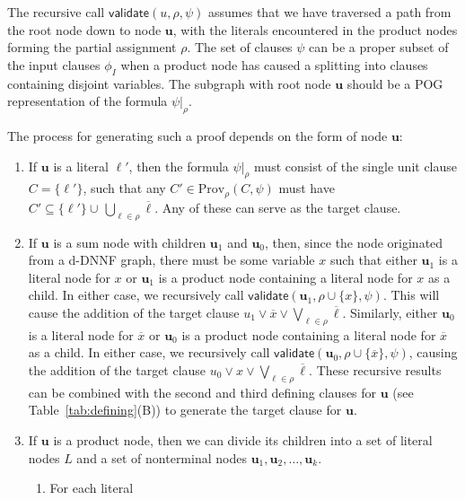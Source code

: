 \documentclass[letterpaper,USenglish,cleveref, autoref, thm-restate]{lipics-v2021}
\newcommand{\obar}[1]{\overline{#1}}
\newcommand{\lit}{\ell}
\newcommand{\assign}{\alpha}
\newcommand{\passign}{\rho}
\newcommand{\validate}{\textsf{validate}}
\newcommand{\prov}{\textrm{Prov}}
\newcommand{\inputformula}{\phi_I}
\newcommand{\makenode}[1]{\mathbf{#1}}
\newcommand{\nodeu}{\makenode{u}}
\newcommand{\simplify}[2]{#1|_{#2}}
\begin{document}
The recursive call $\validate(u, \passign, \psi)$ assumes that we have
traversed a path from the root node down to node $\nodeu$, with the
literals encountered in the product nodes forming the partial
assignment $\passign$.  The set of clauses $\psi$ can be a proper
subset of the input clauses $\inputformula$ when a product node has caused
a splitting into clauses containing disjoint variables.
The subgraph with root node $\nodeu$ should be a POG representation of the formula
$\simplify{\psi}{\passign}$.

The process for generating such a proof depends on the form of node $\nodeu$:
\begin{enumerate}
\item If $\nodeu$ is a literal $\lit'$, then the formula
  $\simplify{\psi}{\passign}$ must consist of the single unit clause
  $C = \{\lit'\}$, such that any $C' \in \prov_{\passign}(C, \psi)$ must have $C' \subseteq \{ \lit' \} \cup\, \bigcup_{\lit \in \passign} \obar{\lit}$.
  Any of these can
  serve as the target clause.
\item If $\nodeu$ is a sum node with children $\nodeu_1$ and $\nodeu_0$,
  then, since the node originated from a d-DNNF graph, there must be
  some variable $x$ such that either $\nodeu_1$ is a literal node for $x$ or $\nodeu_1$ is a
  product node containing a literal node for $x$ as a child.  In either case, we
  recursively call $\validate(\nodeu_1, \passign \cup \{ x \}, \psi)$.
  This will cause the addition of the target clause
  $u_1 \lor \obar{x} \lor \bigvee_{\lit \in \passign} \obar{\lit}$.
Similarly, either $\nodeu_0$ is a literal node for $\obar{x}$ or $\nodeu_0$ is a product node containing a literal node for $\obar{x}$ as
  a child.  In either case, we recursively call $\validate(\nodeu_0, \passign \cup \{ \obar{x} \}, \psi)$,
  causing the addition of the target clause
  $u_0 \lor x \lor \bigvee_{\lit \in \passign} \obar{\lit}$.
  These recursive results can be combined with the second and third defining clauses for $\nodeu$
(see Table~\ref{tab:defining}(B))
  to generate the target clause for $\nodeu$.
\item If $\nodeu$ is a product node, then we can divide its children
  into a set of literal nodes $L$ and a set of nonterminal nodes $\nodeu_1, \nodeu_2, \ldots, \nodeu_k$.
  \begin{enumerate}
    \item For each literal

\end{enumerate}
\end{enumerate}
\end{document}

